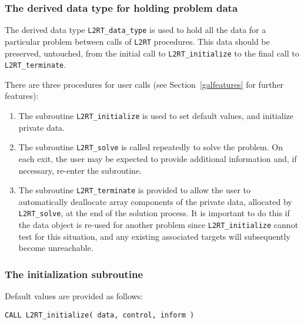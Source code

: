\documentclass{galahad}
\newcommand{\packagename}{L2\-RT}
\begin{document}

\subsubsection{The derived data type for holding problem data}\label{typedata}
The derived data type
{\tt \packagename\_data\_type}
is used to hold all the data for a particular problem between calls of
{\tt \packagename} procedures.
This data should be preserved, untouched, from the initial call to
{\tt \packagename\_initialize}
to the final call to
{\tt \packagename\_terminate}.


\galarguments
There are three procedures for user calls
(see Section~\ref{galfeatures} for further features):

\begin{enumerate}
\item The subroutine
      {\tt \packagename\_initialize}
      is used to set default values, and initialize private data.
\item The subroutine
      {\tt \packagename\_solve}
      is called repeatedly to solve the problem.
      On each exit, the user may be expected to provide additional
      information and, if necessary, re-enter the subroutine.
\item The subroutine
      {\tt \packagename\_terminate}
      is provided to allow the user to automatically deallocate array
       components of the private data, allocated by
       {\tt \packagename\_solve},
       at the end of the solution process.
       It is important to do this if the data object is re-used for another
       problem since {\tt \packagename\_initialize} cannot test for this
       situation,
       and any existing associated targets will subsequently become
       unreachable.
\end{enumerate}


\subsubsection{The initialization subroutine}\label{subinit}
 Default values are provided as follows:

\hskip0.5in
{\tt CALL \packagename\_initialize( data, control, inform )}
\end{document}
